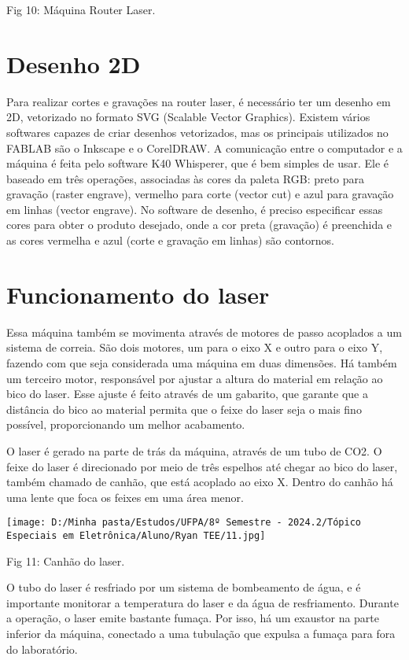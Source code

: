 \documentclass[
]{book}
\begin{document}
Fig 10: Máquina Router Laser.

\section{Desenho 2D}\label{desenho-2d}

Para realizar cortes e gravações na router laser, é necessário ter um desenho em 2D, vetorizado no formato SVG (Scalable Vector Graphics). Existem vários softwares capazes de criar desenhos vetorizados, mas os principais utilizados no FABLAB são o Inkscape e o CorelDRAW. A comunicação entre o computador e a máquina é feita pelo software K40 Whisperer, que é bem simples de usar. Ele é baseado em três operações, associadas às cores da paleta RGB: preto para gravação (raster engrave), vermelho para corte (vector cut) e azul para gravação em linhas (vector engrave). No software de desenho, é preciso especificar essas cores para obter o produto desejado, onde a cor preta (gravação) é preenchida e as cores vermelha e azul (corte e gravação em linhas) são contornos.

\section{Funcionamento do laser}\label{funcionamento-do-laser}

Essa máquina também se movimenta através de motores de passo acoplados a um sistema de correia. São dois motores, um para o eixo X e outro para o eixo Y, fazendo com que seja considerada uma máquina em duas dimensões. Há também um terceiro motor, responsável por ajustar a altura do material em relação ao bico do laser. Esse ajuste é feito através de um gabarito, que garante que a distância do bico ao material permita que o feixe do laser seja o mais fino possível, proporcionando um melhor acabamento.

O laser é gerado na parte de trás da máquina, através de um tubo de CO2. O feixe do laser é direcionado por meio de três espelhos até chegar ao bico do laser, também chamado de canhão, que está acoplado ao eixo X. Dentro do canhão há uma lente que foca os feixes em uma área menor.

\texttt{[image: D:/Minha pasta/Estudos/UFPA/8º Semestre - 2024.2/Tópico Especiais em Eletrônica/Aluno/Ryan TEE/11.jpg]}

Fig 11: Canhão do laser.

O tubo do laser é resfriado por um sistema de bombeamento de água, e é importante monitorar a temperatura do laser e da água de resfriamento. Durante a operação, o laser emite bastante fumaça. Por isso, há um exaustor na parte inferior da máquina, conectado a uma tubulação que expulsa a fumaça para fora do laboratório.
\end{document}
